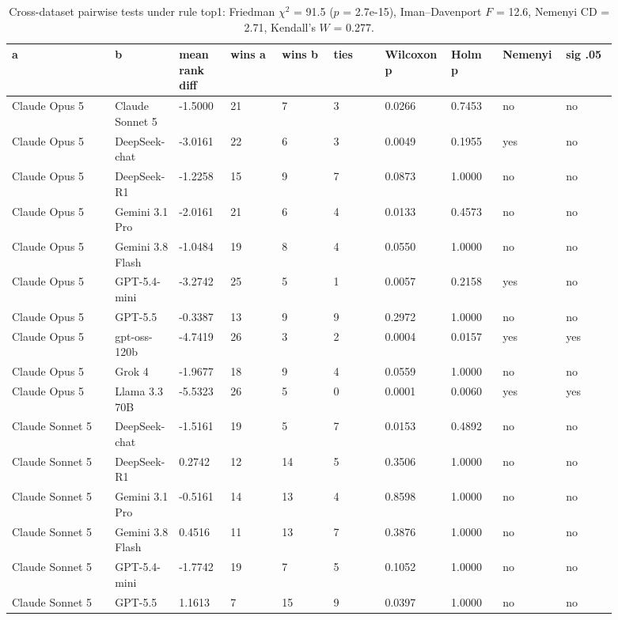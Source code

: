 \begin{landscape}
\tiny
\setlength{\tabcolsep}{3pt}
\begin{longtable}{p{0.162\linewidth}p{0.081\linewidth}p{0.081\linewidth}p{0.081\linewidth}p{0.081\linewidth}p{0.081\linewidth}p{0.081\linewidth}p{0.081\linewidth}p{0.081\linewidth}p{0.081\linewidth}}
\caption{Cross-dataset pairwise tests under rule top1: Friedman $\chi^2$ = 91.5 ($p$ = 2.7e-15), Iman--Davenport $F$ = 12.6, Nemenyi CD = 2.71, Kendall's $W$ = 0.277.}\label{tab:pairwise_top1}\\
\toprule
a & b & mean rank diff & wins a & wins b & ties & Wilcoxon p & Holm p & Nemenyi & sig .05 \\
\midrule
Claude Opus 5 & Claude Sonnet 5 & -1.5000 & 21 & 7 & 3 & 0.0266 & 0.7453 & no & no \\
Claude Opus 5 & DeepSeek-chat & -3.0161 & 22 & 6 & 3 & 0.0049 & 0.1955 & yes & no \\
Claude Opus 5 & DeepSeek-R1 & -1.2258 & 15 & 9 & 7 & 0.0873 & 1.0000 & no & no \\
Claude Opus 5 & Gemini 3.1 Pro & -2.0161 & 21 & 6 & 4 & 0.0133 & 0.4573 & no & no \\
Claude Opus 5 & Gemini 3.8 Flash & -1.0484 & 19 & 8 & 4 & 0.0550 & 1.0000 & no & no \\
Claude Opus 5 & GPT-5.4-mini & -3.2742 & 25 & 5 & 1 & 0.0057 & 0.2158 & yes & no \\
Claude Opus 5 & GPT-5.5 & -0.3387 & 13 & 9 & 9 & 0.2972 & 1.0000 & no & no \\
Claude Opus 5 & gpt-oss-120b & -4.7419 & 26 & 3 & 2 & 0.0004 & 0.0157 & yes & yes \\
Claude Opus 5 & Grok 4 & -1.9677 & 18 & 9 & 4 & 0.0559 & 1.0000 & no & no \\
Claude Opus 5 & Llama 3.3 70B & -5.5323 & 26 & 5 & 0 & 0.0001 & 0.0060 & yes & yes \\
Claude Sonnet 5 & DeepSeek-chat & -1.5161 & 19 & 5 & 7 & 0.0153 & 0.4892 & no & no \\
Claude Sonnet 5 & DeepSeek-R1 & 0.2742 & 12 & 14 & 5 & 0.3506 & 1.0000 & no & no \\
Claude Sonnet 5 & Gemini 3.1 Pro & -0.5161 & 14 & 13 & 4 & 0.8598 & 1.0000 & no & no \\
Claude Sonnet 5 & Gemini 3.8 Flash & 0.4516 & 11 & 13 & 7 & 0.3876 & 1.0000 & no & no \\
Claude Sonnet 5 & GPT-5.4-mini & -1.7742 & 19 & 7 & 5 & 0.1052 & 1.0000 & no & no \\
Claude Sonnet 5 & GPT-5.5 & 1.1613 & 7 & 15 & 9 & 0.0397 & 1.0000 & no & no \\

\end{longtable}
\end{landscape}
